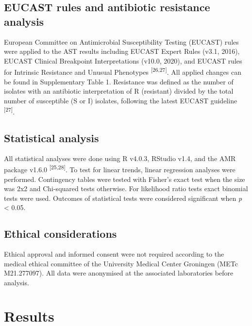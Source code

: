 \documentclass[
]{book}
\begin{document}
\hypertarget{eucast-rules-and-antibiotic-resistance-analysis}{%
\subsection{EUCAST rules and antibiotic resistance analysis}\label{eucast-rules-and-antibiotic-resistance-analysis}}

European Committee on Antimicrobial Susceptibility Testing (EUCAST) rules were applied to the AST results including EUCAST Expert Rules (v3.1, 2016), EUCAST Clinical Breakpoint Interpretations (v10.0, 2020), and EUCAST rules for Intrinsic Resistance and Unusual Phenotypes \textsuperscript{{[}26,27{]}}. All applied changes can be found in Supplementary Table 1. Resistance was defined as the number of isolates with an antibiotic interpretation of R (resistant) divided by the total number of susceptible (S or I) isolates, following the latest EUCAST guideline \textsuperscript{{[}27{]}}.

\hypertarget{statistical-analysis}{%
\subsection{Statistical analysis}\label{statistical-analysis}}

All statistical analyses were done using R v4.0.3, RStudio v1.4, and the AMR package v1.6.0 \textsuperscript{{[}25,28{]}}. To test for linear trends, linear regression analyses were performed. Contingency tables were tested with Fisher's exact test when the size was 2x2 and Chi-squared tests otherwise. For likelihood ratio tests exact binomial tests were used. Outcomes of statistical tests were considered significant when \emph{p} \textless{} 0.05.

\hypertarget{ethical-considerations}{%
\subsection{Ethical considerations}\label{ethical-considerations}}

Ethical approval and informed consent were not required according to the medical ethical committee of the University Medical Center Groningen (METc M21.277097). All data were anonymised at the associated laboratories before analysis.

\hypertarget{results-2}{%
\section{Results}\label{results-2}}
\end{document}

